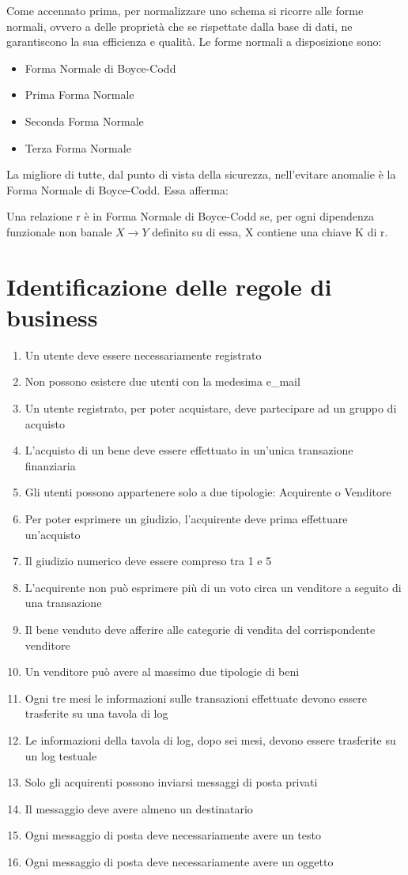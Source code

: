 \documentclass[a4paper, 10pt]{report}
\begin{document}
Come accennato prima, per normalizzare uno schema si ricorre alle forme normali, ovvero a delle propriet\`a che se rispettate dalla base di dati, ne garantiscono la sua efficienza e qualit\`a. Le forme normali a disposizione sono:
\begin{itemize}
\item Forma Normale di Boyce-Codd
\item Prima Forma Normale
\item Seconda Forma Normale
\item Terza Forma Normale
\end{itemize}
La migliore di tutte, dal punto di vista della sicurezza, nell'evitare anomalie \`e la Forma Normale di Boyce-Codd. Essa afferma:
\begin{mydef}
Una relazione r \`e in Forma Normale di Boyce-Codd se, per ogni dipendenza funzionale non banale $X \rightarrow Y$ definito su di essa, X contiene una chiave K di r. 
\end{mydef}
\chapter{Identificazione delle regole di business}
\begin{enumerate}
\item Un utente deve essere necessariamente registrato
\item Non possono esistere due utenti con la medesima e\_mail
\item Un utente registrato, per poter acquistare, deve partecipare ad un gruppo di acquisto
\item L'acquisto di un bene deve essere effettuato in un'unica transazione finanziaria
\item Gli utenti possono appartenere solo a due tipologie: Acquirente o Venditore
\item Per poter esprimere un giudizio, l'acquirente deve prima effettuare un'acquisto
\item Il giudizio numerico deve essere compreso tra 1 e 5
\item L'acquirente non pu\`o esprimere pi\`u di un voto circa un venditore a seguito di una transazione
\item Il bene venduto deve afferire alle categorie di vendita del corrispondente venditore
\item Un venditore pu\`o avere al massimo due tipologie di beni
\item Ogni tre mesi le informazioni sulle transazioni effettuate devono essere trasferite su una tavola di log
\item Le informazioni della tavola di log, dopo sei mesi, devono essere trasferite su un log testuale
\item Solo gli acquirenti possono inviarsi messaggi di posta privati
\item Il messaggio deve avere almeno un destinatario
\item Ogni messaggio di posta deve necessariamente avere un testo
\item Ogni messaggio di posta deve necessariamente avere un oggetto
\end{enumerate}
\end{document}
